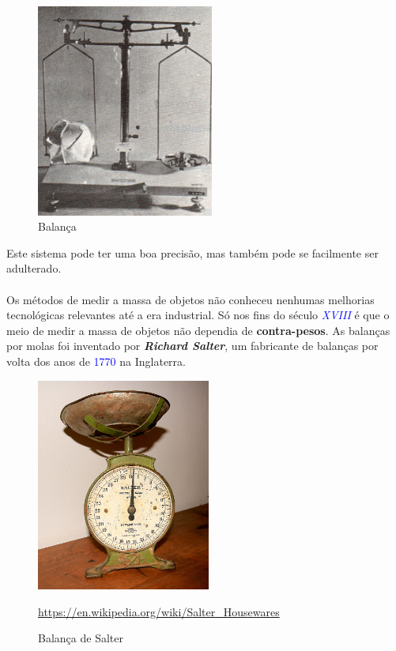 \begin{minipage}[!b]{0.45\linewidth}
	\begin{figure}[H]
		\centering
		\includegraphics[height=7cm]{./image/PESTA/general/balanca_4.jpg}
		\caption{Balança}
		\label{balanca_4}
	\end{figure}
\end{minipage}
\newline
\newline
\newline
Este sistema pode ter uma boa precisão, mas também pode se facilmente ser adulterado.
\\
\\
Os métodos de medir a massa de objetos não conheceu nenhumas melhorias tecnológicas relevantes até a era industrial. Só nos fins do século \textcolor{blue}{\textit{XVIII}} é que o meio de medir a massa de objetos não dependia de \textbf{contra-pesos}. As balanças por molas foi inventado por \textbf{\textit{Richard Salter}}, um fabricante de balanças por volta dos anos de \textcolor{blue}{1770} na Inglaterra.
\\
\begin{figure}[H]
	\centering
	\includegraphics[height=7cm]{./image/PESTA/general/Weigh_Scale_Salter_1.jpg}
	\caption{Balança de Salter}
	\url{https://en.wikipedia.org/wiki/Salter_Housewares}
	\label{Weigh_Scale_Salter_1}
\end{figure}

